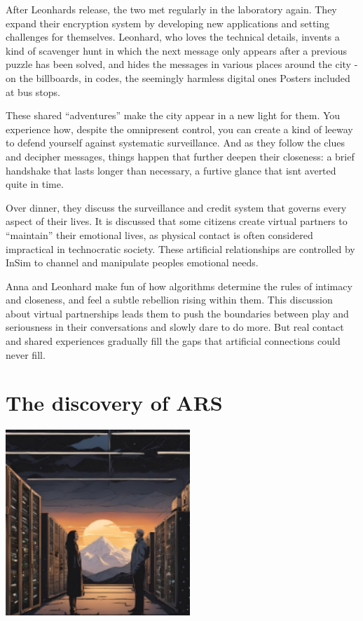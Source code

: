 \documentclass[
]{article}
\begin{document}
After Leonhard\textquotesingle s release, the two met regularly in the
laboratory again. They expand their encryption system by developing new
applications and setting challenges for themselves. Leonhard, who loves
the technical details, invents a kind of scavenger hunt in which the
next message only appears after a previous puzzle has been solved, and
hides the messages in various places around the city - on the
billboards, in codes, the seemingly harmless digital ones Posters
included at bus stops.

These shared ``adventures'' make the city appear in a new light for
them. You experience how, despite the omnipresent control, you can
create a kind of leeway to defend yourself against systematic
surveillance. And as they follow the clues and decipher messages, things
happen that further deepen their closeness: a brief handshake that lasts
longer than necessary, a furtive glance that isn\textquotesingle t
averted quite in time.

Over dinner, they discuss the surveillance and credit system that
governs every aspect of their lives. It is discussed that some citizens
create virtual partners to ``maintain'' their emotional lives, as
physical contact is often considered impractical in technocratic
society. These artificial relationships are controlled by InSim to
channel and manipulate people\textquotesingle s emotional needs.

Anna and Leonhard make fun of how algorithms determine the rules of
intimacy and closeness, and feel a subtle rebellion rising within them.
This discussion about virtual partnerships leads them to push the
boundaries between play and seriousness in their conversations and
slowly dare to do more. But real contact and shared experiences
gradually fill the gaps that artificial connections could never fill.

\section{The discovery of ARS}\label{the-discovery-of-ars}

\includegraphics[width=2.73958in,height=2.76042in]{media/image0004.png}
\end{document}
